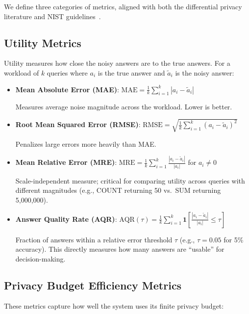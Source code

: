 \documentclass[sigconf,nonacm]{acmart}
\begin{document}
We define three categories of metrics, aligned with both the differential privacy literature and NIST guidelines~\cite{nist2025sp800226}.

\subsection{Utility Metrics}

Utility measures how close the noisy answers are to the true answers. For a workload of $k$ queries where $a_i$ is the true answer and $\tilde{a}_i$ is the noisy answer:

\begin{itemize}
    \item \textbf{Mean Absolute Error (MAE)}: $\text{MAE} = \frac{1}{k} \sum_{i=1}^{k} |a_i - \tilde{a}_i|$

    Measures average noise magnitude across the workload. Lower is better.

    \item \textbf{Root Mean Squared Error (RMSE)}: $\text{RMSE} = \sqrt{\frac{1}{k} \sum_{i=1}^{k} (a_i - \tilde{a}_i)^2}$

    Penalizes large errors more heavily than MAE.

    \item \textbf{Mean Relative Error (MRE)}: $\text{MRE} = \frac{1}{k} \sum_{i=1}^{k} \frac{|a_i - \tilde{a}_i|}{|a_i|}$ for $a_i \neq 0$

    Scale-independent measure; critical for comparing utility across queries with different magnitudes (e.g., COUNT returning 50 vs.\ SUM returning 5,000,000).

    \item \textbf{Answer Quality Rate (AQR)}: $\text{AQR}(\tau) = \frac{1}{k} \sum_{i=1}^{k} \mathbf{1}\left[\frac{|a_i - \tilde{a}_i|}{|a_i|} \leq \tau\right]$

    Fraction of answers within a relative error threshold $\tau$ (e.g., $\tau = 0.05$ for 5\% accuracy). This directly measures how many answers are ``usable'' for decision-making.
\end{itemize}

\subsection{Privacy Budget Efficiency Metrics}

These metrics capture how well the system uses its finite privacy budget:
\end{document}
